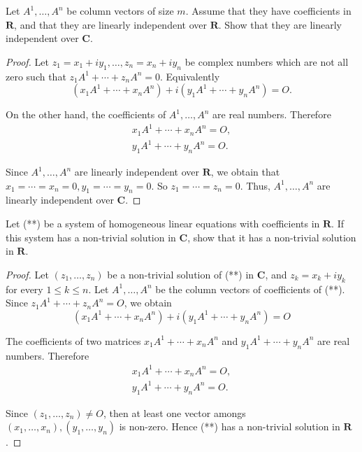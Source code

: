 \begin{exercise}
    Let $A^{1}, \ldots, A^{n}$ be column vectors of size $m$. Assume that they have coefficients in $\mathbf{R}$, and that they are linearly independent over $\mathbf{R}$. Show that they are linearly independent over $\mathbf{C}$.
\end{exercise}

\begin{proof}
    Let $z_{1} = x_{1} + iy_{1}, \ldots, z_{n} = x_{n} + iy_{n}$ be complex numbers which are not all zero such that $z_{1}A^{1} + \cdots + z_{n}A^{n} = 0$. Equivalently
    \[
        ( x_{1}A^{1} + \cdots + x_{n}A^{n} ) + i( y_{1}A^{1} + \cdots + y_{n}A^{n} ) = O.
    \]

    On the other hand, the coefficients of $A^{1}, \ldots, A^{n}$ are real numbers. Therefore
    \[
        \begin{split}
            x_{1}A^{1} + \cdots + x_{n}A^{n} = O, \\
            y_{1}A^{1} + \cdots + y_{n}A^{n} = O.
        \end{split}
    \]

    Since $A^{1}, \ldots, A^{n}$ are linearly independent over $\mathbf{R}$, we obtain that $x_{1} = \cdots = x_{n} = 0, y_{1} = \cdots = y_{n} = 0$. So $z_{1} = \cdots = z_{n} = 0$. Thus, $A^{1}, \ldots, A^{n}$ are linearly independent over $\mathbf{C}$.
\end{proof}

\begin{exercise}
    Let (**) be a system of homogeneous linear equations with coefficients in $\mathbf{R}$. If this system has a non-trivial solution in $\mathbf{C}$, show that it has a non-trivial solution in $\mathbf{R}$.
\end{exercise}

\begin{proof}
    Let $(z_{1}, \ldots, z_{n})$ be a non-trivial solution of (**) in $\mathbf{C}$, and $z_{k} = x_{k} + iy_{k}$ for every $1\le k\le n$. Let $A^{1}, \ldots, A^{n}$ be the column vectors of coefficients of (**). Since $z_{1}A^{1} + \cdots + z_{n}A^{n} = O$, we obtain
    \[
        (x_{1}A^{1} + \cdots + x_{n}A^{n}) + i(y_{1}A^{1} + \cdots + y_{n}A^{n}) = O
    \]

    The coefficients of two matrices $x_{1}A^{1} + \cdots + x_{n}A^{n}$ and $y_{1}A^{1} + \cdots + y_{n}A^{n}$ are real numbers. Therefore
    \[
        \begin{split}
            x_{1}A^{1} + \cdots + x_{n}A^{n} = O, \\
            y_{1}A^{1} + \cdots + y_{n}A^{n} = O.
        \end{split}
    \]

    Since $(z_{1},\ldots, z_{n})\ne O$, then at least one vector amongs $(x_{1},\ldots, x_{n}), (y_{1}, \ldots, y_{n})$ is non-zero. Hence (**) has a non-trivial solution in $\mathbf{R}$.
\end{proof}

